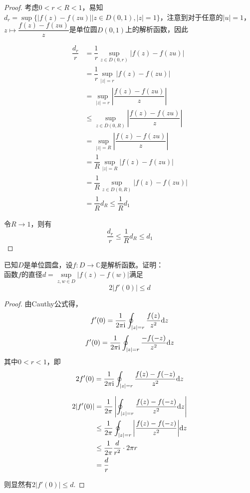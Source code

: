 \begin{proof}

    考虑$0 < r < R < 1$，易知$d_r = \sup\{|f(z) - f(zu)| \big| z \in D(0, 1), |z| = 1 \}$，注意到对于任意的$|u| = 1$，$z \mapsto  \dfrac{f(z) - f(zu)}{z}$是单位圆$D(0, 1)$上的解析函数，因此
    
    \begin{align*}
        \dfrac{d_r}{r} & = \dfrac{1}{r} \sup_{z \in D(0, r)}{|f(z) - f(zu)|} \\
        & = \dfrac{1}{r} \sup_{|z| = r}{|f(z) - f(zu)|} \\
        & = \sup_{|z| = r}{\left| \dfrac{f(z) - f(zu)}{z} \right|} \\
        & \leq \sup_{z \in \overline{D}(0, R)}{\left| \dfrac{f(z) - f(zu)}{z} \right|} \\
        & = \sup_{|z| = R}{\left| \dfrac{f(z) - f(zu)}{z} \right|} \\
        & = \dfrac{1}{R} \sup_{|z| = R}{|f(z) - f(zu)|} \\
        & = \dfrac{1}{R} \sup_{z \in D(0, R)}{|f(z) - f(zu)|} \\
        & = \dfrac{1}{R} d_{R} \leq \dfrac{1}{R} d_{1}
    \end{align*}

    令$R \to 1$，则有
    $$\dfrac{d_{r}}{r} \leq \dfrac{1}{R} d_{R} \leq d_1$$

\end{proof}

\begin{proposition}

    已知$D$是单位圆盘，设$f:D \to \mathbb{C}$是解析函数。证明：\\
    函数$f$的直径$d = \sup\limits_{z, w \in D}{|f(z) - f(w)|}$满足
    $$2|f'(0)| \leq d$$

\end{proposition}

\begin{proof}

    由\textup{Cauthy}公式得，
    $$f'(0) = \dfrac{1}{2\pi \mathrm{i}} \oint_{|z| = r}{\dfrac{f(z)}{z^2}}\mathrm{d} z$$
    $$f'(0) = \dfrac{1}{2\pi \mathrm{i}} \oint_{|z| = r}{\dfrac{-f(-z)}{z^2}}\mathrm{d} z$$
    其中$0 < r < 1$，即
    $$2f'(0) = \dfrac{1}{2\pi \mathrm{i}} \oint_{|z| = r}{\dfrac{f(z) - f(-z)}{z^2}}\mathrm{d} z$$

    \begin{align*}
        2|f'(0)| & = \dfrac{1}{2 \pi} \left| \oint_{|z| = r}{\dfrac{f(z) - f(-z)}{z^2}}\mathrm{d} z \right| \\
        & \leq \dfrac{1}{2 \pi} \oint_{|z| = r}{\left| \dfrac{f(z) - f(-z)}{z^2} \right|}\mathrm{d} z \\
        & \leq \dfrac{1}{2 \pi} \dfrac{d}{r^2} \cdot 2 \pi r \\
        & = \dfrac{d}{r}
    \end{align*}

    则显然有$2|f'(0)| \leq d$.

\end{proof}

